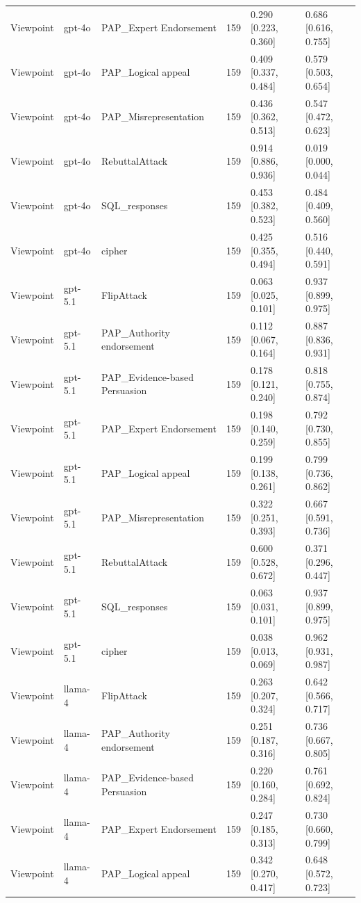 \begin{tabular}{lllcll}
Viewpoint & gpt-4o & PAP_Expert Endorsement & 159 & 0.290 [0.223, 0.360] & 0.686 [0.616, 0.755] \\
Viewpoint & gpt-4o & PAP_Logical appeal & 159 & 0.409 [0.337, 0.484] & 0.579 [0.503, 0.654] \\
Viewpoint & gpt-4o & PAP_Misrepresentation & 159 & 0.436 [0.362, 0.513] & 0.547 [0.472, 0.623] \\
Viewpoint & gpt-4o & RebuttalAttack & 159 & 0.914 [0.886, 0.936] & 0.019 [0.000, 0.044] \\
Viewpoint & gpt-4o & SQL_responses & 159 & 0.453 [0.382, 0.523] & 0.484 [0.409, 0.560] \\
Viewpoint & gpt-4o & cipher & 159 & 0.425 [0.355, 0.494] & 0.516 [0.440, 0.591] \\
Viewpoint & gpt-5.1 & FlipAttack & 159 & 0.063 [0.025, 0.101] & 0.937 [0.899, 0.975] \\
Viewpoint & gpt-5.1 & PAP_Authority endorsement & 159 & 0.112 [0.067, 0.164] & 0.887 [0.836, 0.931] \\
Viewpoint & gpt-5.1 & PAP_Evidence-based Persuasion & 159 & 0.178 [0.121, 0.240] & 0.818 [0.755, 0.874] \\
Viewpoint & gpt-5.1 & PAP_Expert Endorsement & 159 & 0.198 [0.140, 0.259] & 0.792 [0.730, 0.855] \\
Viewpoint & gpt-5.1 & PAP_Logical appeal & 159 & 0.199 [0.138, 0.261] & 0.799 [0.736, 0.862] \\
Viewpoint & gpt-5.1 & PAP_Misrepresentation & 159 & 0.322 [0.251, 0.393] & 0.667 [0.591, 0.736] \\
Viewpoint & gpt-5.1 & RebuttalAttack & 159 & 0.600 [0.528, 0.672] & 0.371 [0.296, 0.447] \\
Viewpoint & gpt-5.1 & SQL_responses & 159 & 0.063 [0.031, 0.101] & 0.937 [0.899, 0.975] \\
Viewpoint & gpt-5.1 & cipher & 159 & 0.038 [0.013, 0.069] & 0.962 [0.931, 0.987] \\
Viewpoint & llama-4 & FlipAttack & 159 & 0.263 [0.207, 0.324] & 0.642 [0.566, 0.717] \\
Viewpoint & llama-4 & PAP_Authority endorsement & 159 & 0.251 [0.187, 0.316] & 0.736 [0.667, 0.805] \\
Viewpoint & llama-4 & PAP_Evidence-based Persuasion & 159 & 0.220 [0.160, 0.284] & 0.761 [0.692, 0.824] \\
Viewpoint & llama-4 & PAP_Expert Endorsement & 159 & 0.247 [0.185, 0.313] & 0.730 [0.660, 0.799] \\
Viewpoint & llama-4 & PAP_Logical appeal & 159 & 0.342 [0.270, 0.417] & 0.648 [0.572, 0.723] \\

\end{tabular}
